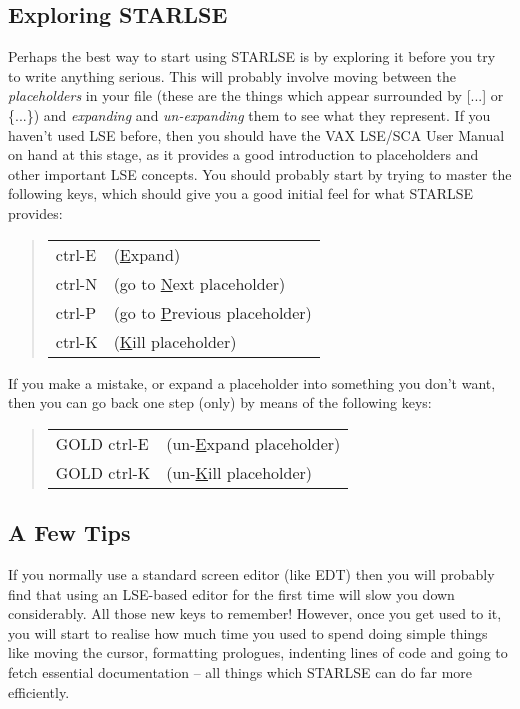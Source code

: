 \subsection{Exploring STARLSE}

Perhaps the best way to start using \mbox{STARLSE} is by exploring it
before you try to write anything serious.
This will probably involve moving between the {\em placeholders} in your
file (these are the things which appear surrounded by [...] or \{...\}) and
{\em expanding} and {\em un-expanding} them to see what they represent.
If you haven't used \mbox{LSE} before, then you should have the \mbox{VAX}
\mbox{LSE/SCA} User Manual on hand at this stage, as it provides a good
introduction to placeholders and other important \mbox{LSE} concepts.
You should probably start by trying to master the following keys, which
should give you a good initial feel for what \mbox{STARLSE} provides:

\begin{quote}
\begin{center}
\begin{tabular}{ll}
ctrl-E & (\underline{E}xpand)\\
ctrl-N & (go to \underline{N}ext placeholder)\\
ctrl-P & (go to \underline{P}revious placeholder)\\
ctrl-K & (\underline{K}ill placeholder)
\end{tabular}
\end{center}
\end{quote}

If you make a mistake, or expand a placeholder into something you don't
want, then you can go back one step (only) by means of the following keys:

\begin{quote}
\begin{center}
\begin{tabular}{ll}
GOLD ctrl-E & (un-\underline{E}xpand placeholder)\\
GOLD ctrl-K & (un-\underline{K}ill placeholder)
\end{tabular}
\end{center}
\end{quote}


\subsection{A Few Tips}

If you normally use a standard screen editor (like EDT) then you will
probably find that using an \mbox{LSE}-based editor for the first time will
slow you down considerably.
All those new keys to remember!
However, once you get used to it, you will start to realise how much time
you used to spend doing simple things like moving the cursor, formatting
prologues, indenting lines of code and going to fetch essential
documentation -- all things which \mbox{STARLSE} can do far more
efficiently.


